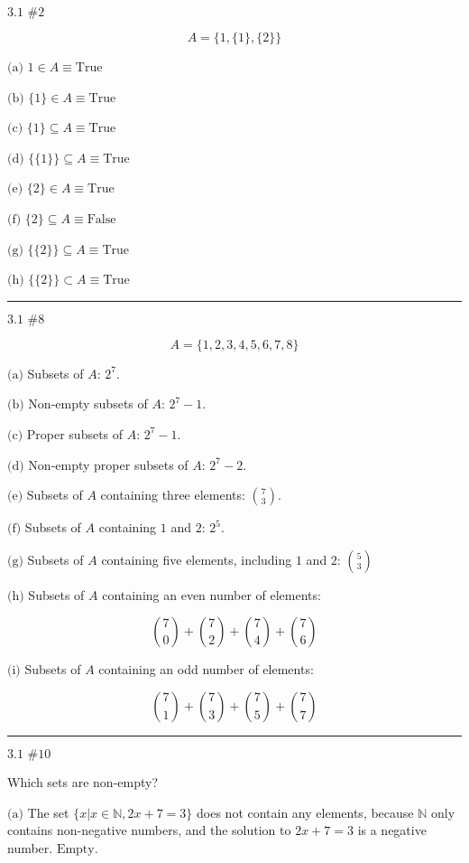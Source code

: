\documentclass{article}
\newcommand{\T}{\text{True}}
\newcommand{\F}{\text{False}}
\newcommand{\problem}[2]{$\boxed{\text{#1 \##2}}$}
\newcommand{\subproblem}[1]{$\boxed{\text{(#1)}}$}
\begin{document}
\begin{multicols*}{2}

%
\problem{3.1}{2}

\[
A=\{1,\{1\},\{2\}\}
\]

%
\subproblem{a} $1\in A\equiv\boxed{\T}$

%
\subproblem{b} $\{1\}\in A\equiv\boxed{\T}$

%
\subproblem{c} $\{1\}\subseteq A\equiv\boxed{\T}$

%
\subproblem{d} $\{\{1\}\}\subseteq A\equiv\boxed{\T}$

%
\subproblem{e} $\{2\}\in A\equiv\boxed{\T}$

%
\subproblem{f} $\{2\}\subseteq A\equiv\boxed{\F}$

%
\subproblem{g} $\{\{2\}\}\subseteq A\equiv\boxed{\T}$

%
\subproblem{h} $\{\{2\}\}\subset A\equiv\boxed{\T}$

\rule{\linewidth}{0.4pt}

%
\problem{3.1}{8}

\[
A=\{1,2,3,4,5,6,7,8\}
\]

%
\subproblem{a} Subsets of $A$: $\boxed{2^7}$.

%
\subproblem{b} Non-empty subsets of $A$: $\boxed{2^7-1}$.

%
\subproblem{c} Proper subsets of $A$: $\boxed{2^7-1}$.

%
\subproblem{d} Non-empty proper subsets of $A$: $\boxed{2^7-2}$.

%
\subproblem{e} Subsets of $A$ containing three elements:
$\boxed{\binom{7}{3}}$.

%
\subproblem{f} Subsets of $A$ containing $1$ and $2$: $\boxed{2^5}$.

%
\subproblem{g} Subsets of $A$ containing five elements, including $1$
and $2$: $\boxed{\binom{5}{3}}$

%
\subproblem{h} Subsets of $A$ containing an even number of elements:

\[
\boxed{\binom{7}{0}+\binom{7}{2}+\binom{7}{4}+\binom{7}{6}}
\]

%
\subproblem{i} Subsets of $A$ containing an odd number of elements:

\[
\boxed{\binom{7}{1}+\binom{7}{3}+\binom{7}{5}+\binom{7}{7}}
\]

\rule{\linewidth}{0.4pt}

%
\problem{3.1}{10}

Which sets are non-empty?

%
\subproblem{a} The set $\{x|x\in\mathbb{N}, 2x+7=3\}$ does not contain
any elements, because $\mathbb{N}$ only contains non-negative numbers,
and the solution to $2x+7=3$ is a negative
number. $\boxed{\text{Empty}}$.


\end{multicols*}
\end{document}
